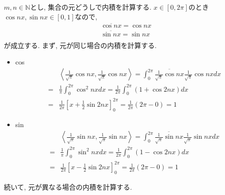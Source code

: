 \documentclass[a4paper,11pt]{jsarticle}
\begin{document}
\section{}
$m, n \in \mathbb{N}$とし, 集合の元どうしで内積を計算する.
$x \in [0, 2\pi]$のとき$\cos{nx}, \sin{nx} \in [0, 1]$なので, 
\begin{eqnarray*}
  \overline{\cos{nx}} = \cos{nx} \\
  \overline{\sin{nx}} = \sin{nx} \\
\end{eqnarray*}
が成立する. まず, 元が同じ場合の内積を計算する.
\begin{itemize}
  \item cos
    \begin{eqnarray*}
      && \left<\frac{1}{\sqrt{\pi}}\cos{nx}, \frac{1}{\sqrt{\pi}}\cos{nx}\right>
      = \int_{0}^{2\pi}{\overline{\frac{1}{\sqrt{\pi}}\cos{nx}}\frac{1}{\sqrt{\pi}}\cos{nx}}dx \\
      &=& \frac{1}{\pi}\int_{0}^{2\pi}{\cos^{2}{nx}}dx
      = \frac{1}{2\pi}\int_{0}^{2\pi}{\left(1 + \cos{2nx}\right)}dx \\
      &=& \frac{1}{2\pi}\left[x + \frac{1}{2}\sin{2nx}\right]_{0}^{2\pi}
      = \frac{1}{2\pi}\left(2\pi - 0\right) = 1
    \end{eqnarray*}
  \item sin
    \begin{eqnarray*}
      && \left<\frac{1}{\sqrt{\pi}}\sin{nx}, \frac{1}{\sqrt{\pi}}\sin{nx}\right>
      = \int_{0}^{2\pi}{\overline{\frac{1}{\sqrt{\pi}}\sin{nx}}\frac{1}{\sqrt{\pi}}\sin{nx}}dx \\
      &=& \frac{1}{\pi}\int_{0}^{2\pi}{\sin^{2}{nx}}dx
      = \frac{1}{2\pi}\int_{0}^{2\pi}{\left(1 - \cos{2nx}\right)}dx \\
      &=& \frac{1}{2\pi}\left[x - \frac{1}{2}\sin{2nx}\right]_{0}^{2\pi}
      = \frac{1}{2\pi}\left(2\pi - 0\right) = 1
    \end{eqnarray*}
\end{itemize}
続いて, 元が異なる場合の内積を計算する.
\end{document}
